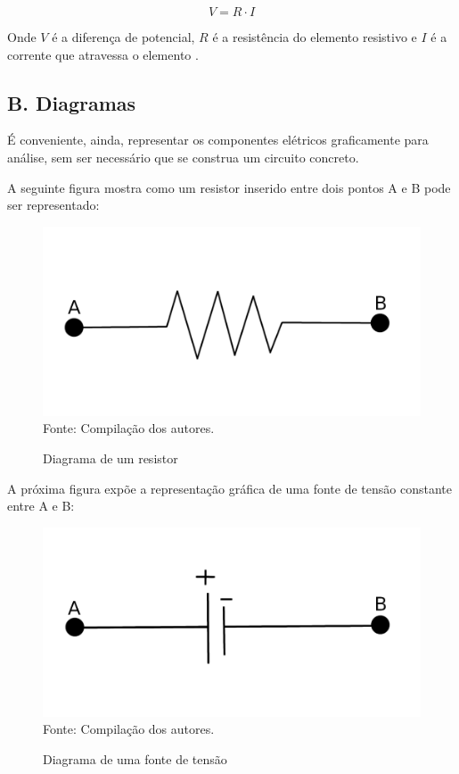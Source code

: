 \documentclass[twocolumn, 10pt]{extarticle}
\begin{document}
\[
V = R\cdot I
\]

Onde $V$ é a diferença de potencial, $R$ é a resistência do elemento resistivo e $I$ é a corrente que atravessa o elemento \cite[p. 28]{sadiku}.

\subsection*{B. \quad Diagramas}

É conveniente, ainda, representar os componentes elétricos graficamente para análise, sem ser necessário que se construa um circuito concreto.

A seguinte figura mostra como um resistor inserido entre dois pontos A e B pode ser representado:

\begin{figure}[H]
	\caption{Diagrama de um resistor} 
	\centering
	\includegraphics[scale=0.7]{res1}
	\\ Fonte: Compilação dos autores.
\end{figure}

A próxima figura expõe a representação gráfica de uma fonte de tensão constante entre A e B:

\begin{figure}[H]
	\caption{Diagrama de uma fonte de tensão} 
	\centering
	\includegraphics[scale=0.7]{vcc1}
	\\ Fonte: Compilação dos autores.
\end{figure}
\end{document}
